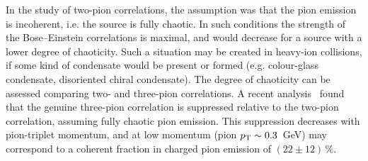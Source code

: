 In the study of two-pion correlations, the assumption was that the pion emission is incoherent, i.e. the source is fully chaotic. In such conditions the strength of the Bose--Einstein correlations is maximal, and would decrease for a source with a lower degree of chaoticity. Such a situation may be created in heavy-ion collisions, if some kind of condensate would be present or formed (e.g. colour-glass condensate, disoriented chiral condensate). The degree of chaoticity can be assessed comparing two- and three-pion correlations. A recent analysis~\cite{Abelev:2013pqa} found that the genuine three-pion correlation is suppressed relative to the two-pion correlation, assuming fully chaotic pion emission. This suppression decreases with pion-triplet momentum, and at low momentum (pion $p_{\rm T} \sim 0.3$~GeV) may correspond to a coherent fraction in charged pion emission of $(22 \pm 12)$\,\%.


